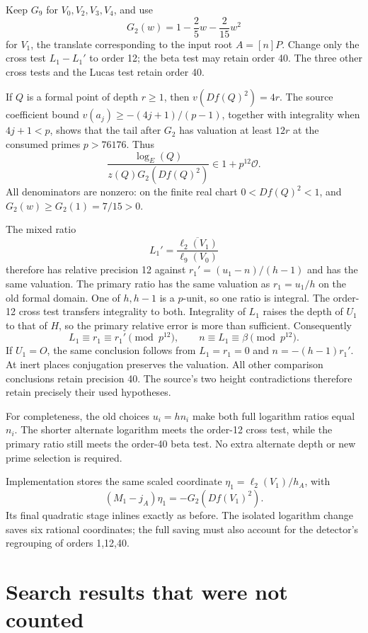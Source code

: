 Keep $G_9$ for $V_0,V_2,V_3,V_4$, and use
\[
 G_2(w)=1-\frac25w-\frac{2}{15}w^2
\]
for $V_1$, the translate corresponding to the input root $A=[n]P$.
Change only the cross test $L_1-L_1'$ to order 12; the beta test may
retain order 40.  The three other cross tests and the Lucas test retain
order 40.

If $Q$ is a formal point of depth $r\ge1$, then
$v(Df(Q)^2)=4r$.  The source coefficient bound
$v(a_j)\ge-(4j+1)/(p-1)$, together with integrality when $4j+1<p$,
shows that the tail after $G_2$ has valuation at least $12r$ at the
consumed primes $p>76176$.  Thus
\[
 \frac{\log_E(Q)}{z(Q)G_2(Df(Q)^2)}\in1+p^{12}\mathcal O.
\]
All denominators are nonzero: on the finite real chart $0<Df(Q)^2<1$,
and $G_2(w)\ge G_2(1)=7/15>0$.

The mixed ratio
\[
 L_1'=\overline{\frac{\ell_2(V_1)}{\ell_9(V_0)}}
\]
therefore has relative precision 12 against
$r_1'=(u_1-n)/(h-1)$ and has the same valuation.  The primary ratio has
the same valuation as $r_1=u_1/h$ on the old formal domain.  One of
$h,h-1$ is a $p$-unit, so one ratio is integral.  The order-12 cross
test transfers integrality to both.  Integrality of $L_1$ raises the
depth of $U_1$ to that of $H$, so the primary relative error is more than
sufficient.  Consequently
\[
 L_1\equiv r_1\equiv r_1'\pmod{p^{12}},
 \qquad n\equiv L_1\equiv\beta\pmod{p^{12}}.
\]
If $U_1=O$, the same conclusion follows from $L_1=r_1=0$ and
$n=-(h-1)r_1'$.  At inert places conjugation preserves the valuation.
All other comparison conclusions retain precision 40.  The source's
two height contradictions therefore retain precisely their used hypotheses.

For completeness, the old choices $u_i=hn_i$ make both full logarithm
ratios equal $n_i$.  The shorter alternate logarithm meets the order-12
cross test, while the primary ratio still meets the order-40 beta test.
No extra alternate depth or new prime selection is required.

Implementation stores the same scaled coordinate $\eta_1=\ell_2(V_1)/h_A$,
with
\[
 (M_1-j_A)\eta_1=-G_2(Df(V_1)^2).
\]
Its final quadratic stage inlines exactly as before.  The isolated
logarithm change saves six rational coordinates; the full saving must
also account for the detector's regrouping of orders 1,12,40.

\section{Search results that were not counted}

